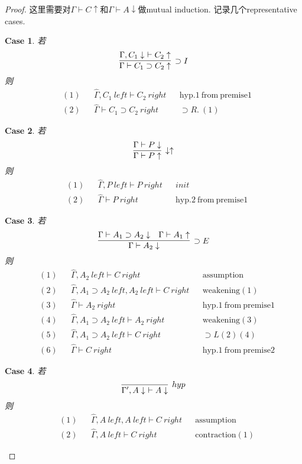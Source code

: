 \documentclass{article}
\theoremstyle{plain}
\newcounter{case}
\newtheorem{case}{Case}
\theoremstyle{nonumberplain}
\newtheorem{proof}{Proof}
\begin{document}
\begin{proof}
\rm 这里需要对$\Gamma \vdash C \uparrow$和$\Gamma \vdash A \downarrow$做mutual induction. 记录几个representative cases.
\begin{case} 若
$$
\infer[\supset I]{\Gamma \vdash C_1 \supset C_2 \uparrow}{\Gamma, C_1 \downarrow\,\, \vdash C_2 \uparrow}
$$
则
$$
\begin{aligned}
&(1) && \widehat{\Gamma}, C_1~left \vdash C_2~right && \text{hyp.1}~\text{from}~\text{premise}1 \\
&(2) &&\widehat{\Gamma} \vdash C_1 \supset C_2 ~right && \supset R.~(1)
\end{aligned}
$$
\end{case}
\begin{case}若
$$
\infer[\downarrow\uparrow]{\Gamma \vdash P \uparrow}{\Gamma \vdash P \downarrow}
$$
则
$$
\begin{aligned}
&(1) && \widehat{\Gamma}, P~left \vdash P~right && init \\
&(2) && \widehat{\Gamma} \vdash P~right && \text{hyp}.2~\text{from}~\text{premise}1
\end{aligned}
$$
\end{case}
\begin{case}若
$$
\infer[\supset E]{\Gamma \vdash A_2 \downarrow}{\Gamma \vdash A_1 \supset A_2 \downarrow & \Gamma \vdash A_1 \uparrow}
$$
则
$$
\begin{aligned}
&(1) &&\widehat{\Gamma}, A_2~left \vdash C~right && \text{assumption} \\
&(2) &&\widehat{\Gamma}, A_1 \supset A_2~left, A_2~left \vdash C~right && \text{weakening} (1) \\ 
&(3) &&\widehat{\Gamma} \vdash A_2~right && \text{hyp}.1~\text{from}~\text{premise}1 \\
&(4) &&\widehat{\Gamma}, A_1 \supset A_2~left \vdash A_2~right && \text{weakening} (3) \\
&(5) &&\widehat{\Gamma}, A_1 \supset A_2~left \vdash C~right && \supset L (2) (4) \\
&(6) &&\widehat{\Gamma} \vdash C~right && \text{hyp}.1~\text{from}~\text{premise}2
\end{aligned}
$$
\end{case}
\begin{case}若
$$
\infer[hyp]{\Gamma', A\downarrow\,\, \vdash A \downarrow}{}
$$
则
$$
\begin{aligned}
&(1) && \widehat{\Gamma}, A~left, A~left \vdash C~right && \text{assumption} \\
&(2) && \widehat{\Gamma}, A~left \vdash C~right && \text{contraction}(1)
\end{aligned}
$$
\end{case}
\end{proof}
\end{document}
